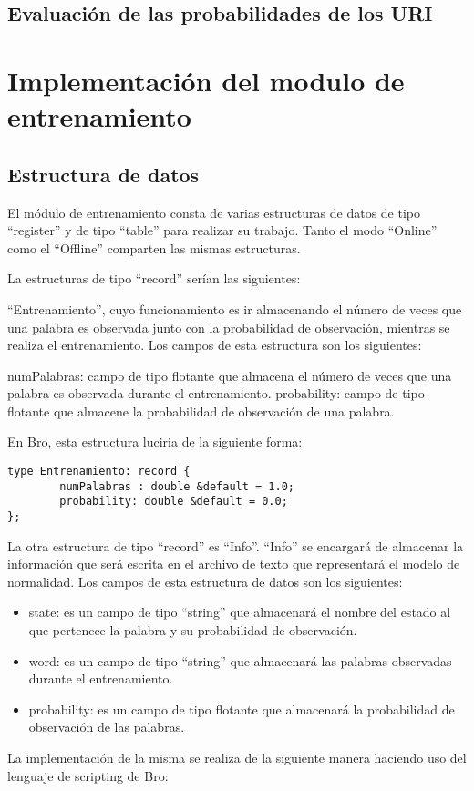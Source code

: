 \subsection{Evaluación de las probabilidades de los URI}


\section{Implementación del modulo de entrenamiento}

\subsection{Estructura de datos}\label{sub:estructuraEntrenamiento}
El módulo de entrenamiento consta de varias estructuras de datos de tipo “register” y de tipo “table” para realizar su trabajo. Tanto el modo “Online” como el “Offline” comparten las mismas estructuras.

La estructuras de tipo “record” serían las siguientes:

“Entrenamiento”, cuyo funcionamiento es ir almacenando el número de veces que una palabra es observada junto con la probabilidad de observación, mientras se realiza el entrenamiento. Los campos de esta estructura son los siguientes:

numPalabras: campo de tipo flotante que almacena el número de veces que una palabra es observada durante el entrenamiento.
probability: campo de tipo flotante que almacene la probabilidad de observación de una palabra.

En Bro, esta estructura luciria de la siguiente forma:

\begin{verbatim}
type Entrenamiento: record { 
        numPalabras : double &default = 1.0;
        probability: double &default = 0.0;
};
\end{verbatim}

La otra estructura de tipo “record” es “Info”. “Info” se encargará de almacenar la información que será escrita en el archivo de texto que representará el modelo de normalidad. Los campos de esta estructura de datos son los siguientes:

\begin{itemize}
\item state: es un campo de tipo “string” que almacenará el nombre del estado al que pertenece la palabra y su probabilidad de observación.
\item word: es un campo de tipo “string” que almacenará las palabras observadas durante el entrenamiento.
\item probability: es un campo de tipo flotante que almacenará la probabilidad de observación de las palabras. 
\end{itemize}
La implementación de la misma se realiza de la siguiente manera haciendo uso del lenguaje de scripting de Bro:

